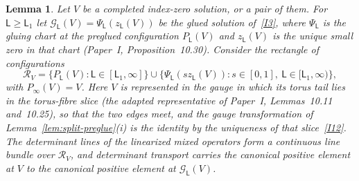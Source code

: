 \documentclass[11pt]{amsart}
\newtheorem{lemma}[theorem]{Lemma}
\theoremstyle{definition}
\theoremstyle{remark}
\theoremstyle{plain}
\numberwithin{equation}{section}
\begin{document}
\begin{lemma}\label{lem:gluing-path}
Let $V$ be a completed index-zero solution, or a pair of them. For
$\mathsf L\ge\mathsf L_1$ let
$\mathcal G_{\mathsf L}(V)=\Psi_{\mathsf L}(z_{\mathsf L}(V))$ be the glued
solution of~\ref{I3}, where $\Psi_{\mathsf L}$ is the gluing chart at the
preglued configuration $P_{\mathsf L}(V)$ and $z_{\mathsf L}(V)$ is the
unique small zero in that chart (Paper~I, Proposition~10.30). Consider
the rectangle of configurations
\[
 \mathcal R_V=\{P_{\mathsf L}(V):\mathsf L\in[\mathsf L_1,\infty]\}
 \cup\{\Psi_{\mathsf L}(sz_{\mathsf L}(V)):s\in[0,1],\
                  \mathsf L\in[\mathsf L_1,\infty)\},
\]
with $P_\infty(V)=V$. Here $V$ is represented in the gauge in which its
torus tail lies in the torus-fibre slice (the adapted representative of
Paper~I, Lemmas~10.11 and~10.25), so that the two edges meet, and the
gauge transformation of Lemma~\ref{lem:split-preglue}(i) is the identity by
the uniqueness of that slice~\ref{I12}. The determinant lines
of the linearized mixed operators form a continuous line bundle over
$\mathcal R_V$, and determinant transport carries the canonical positive
element at $V$ to the canonical positive element at
$\mathcal G_{\mathsf L}(V)$.
\end{lemma}
\end{document}
